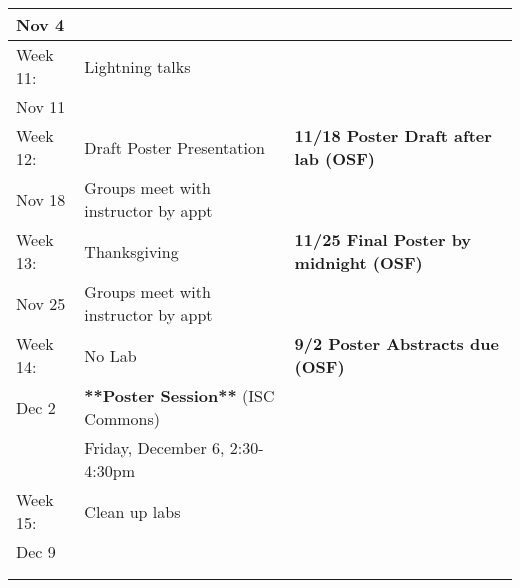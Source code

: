 \documentclass{tufte-handout}
\begin{document}
\begin{tabular}{l l l}
Nov 4 &  & \\
\hline
Week 11: & Lightning talks &\\
Nov 11 \\
\hline
Week 12: & Draft Poster Presentation &   \textbf{11/18 Poster Draft after lab (OSF)} \\
Nov 18 & Groups meet with instructor by appt  \\
\hline
Week 13: & Thanksgiving & \textbf{11/25 Final Poster by midnight (OSF)}\\
Nov 25 &  Groups meet with instructor by appt \\
\hline
Week 14: & No Lab & \textbf{9/2 Poster Abstracts due (OSF)}  \\
Dec 2 & \textbf{**Poster Session**} (ISC Commons) &\\
& Friday, December 6, 2:30-4:30pm \\
\hline 
Week 15: & Clean up labs & \\
Dec 9 &  \\
 &  \\
\hline
\\
\end{tabular}
\end{document}

